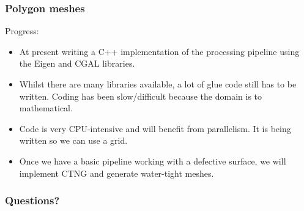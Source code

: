 \documentclass{beamer}
\begin{document}
\begin{frame}
\frametitle{Polygon meshes}

Progress:

\begin{itemize}
\item At present writing a C++ implementation of the processing
  pipeline using the Eigen and CGAL libraries.
\pause
\item Whilst there are many libraries available, a lot of glue code
  still has to be written. Coding has been slow/difficult because the
  domain is to mathematical.
\pause
\item Code is very CPU-intensive and will benefit from parallelism. It
  is being written so we can use a grid.
\pause
\item Once we have a basic pipeline working with a defective surface,
  we will implement CTNG and generate water-tight meshes.
\pause
\end{itemize}

\end{frame}


\begin{frame}
\frametitle{Questions?}

\end{frame}

\begin{frame}
  \printbibliography
\end{frame}
\end{document}
